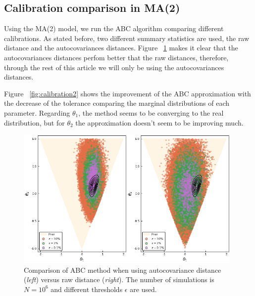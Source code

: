\documentclass[runningheads]{llncs}
\begin{document}
\subsection{Calibration comparison in MA(2)}
\label{subsec:statistical-summaries}

Using the MA(2) model, we run the ABC algorithm comparing
different calibrations. As stated before, two different
summary statistics are used, the raw distance and the
autocovariances distances. Figure ~\ref{fig:calibration1}
makes it clear that
the autocovariances distances perfom better that the raw distances,
therefore, through the rest of this article we will only be using
the autocovariances distances.

Figure ~\ref{fig:calibration2} shows the improvement of the ABC
approximation with the decrease of the tolerance comparing the
marginal distributions of each parameter. Regarding $\theta_1$,
the method seems to be converging to the real distribution,
but for $\theta_2$ the approximation doesn't seem to be improving
much.


    \begin{figure}[H]
        \centering
        \includegraphics[width=11cm]{images/ABCmodel1_Comparison.png}
        \caption{Comparison of ABC method when using autocovariance
        distance 
        (\textit{left}) versus raw distance (\textit{right}).
        The number of simulations is $N = 10^6$ and different
        thresholds $\epsilon$ are used.}
        \label{fig:calibration1}
    \end{figure}
\end{document}
